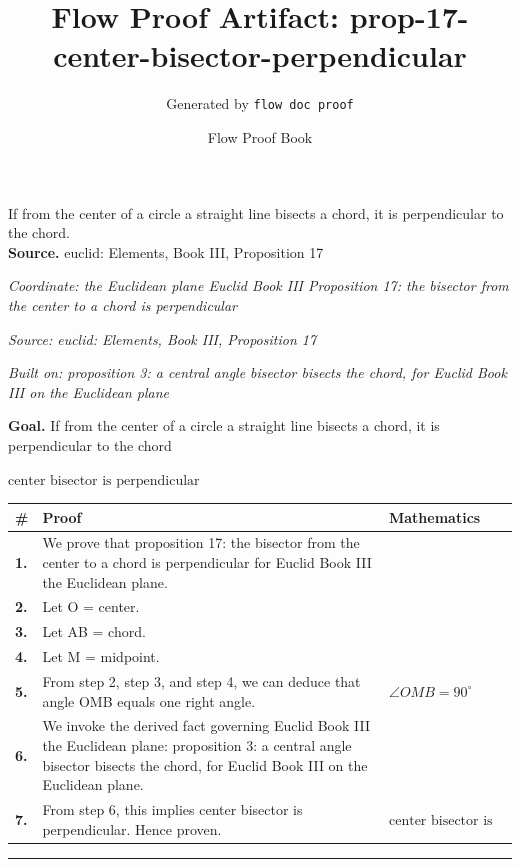 \documentclass[11pt]{article}
\title{Flow Proof Artifact: prop-17-center-bisector-perpendicular}
\author{Generated by \texttt{flow doc proof}}
\date{Flow Proof Book}
\theoremstyle{definition}
\begin{document}
\maketitle
If from the center of a circle a straight line bisects a chord, it is perpendicular to the chord.\\[0.5em]
\textbf{Source.} euclid: Elements, Book III, Proposition 17\\[0.5em]
\bigskip
{}\par
\smallskip\noindent\textit{Coordinate: the Euclidean plane \cdot Euclid Book III \cdot Proposition 17: the bisector from the center to a chord is perpendicular}\par
\smallskip\noindent\textit{Source: euclid: Elements, Book III, Proposition 17}\par
\smallskip\noindent\textit{Built on: proposition 3: a central angle bisector bisects the chord, for Euclid Book III on the Euclidean plane}\par
\medskip
\noindent\textbf{Goal.} If from the center of a circle a straight line bisects a chord, it is perpendicular to the chord\par
\noindent$\displaystyle \text{center bisector is perpendicular}$\par
\medskip
\noindent
\begin{tabular}{@{} >{\raggedright\arraybackslash}p{} >{\raggedright\arraybackslash}p{} >{\raggedleft\arraybackslash}p{} @{}}
\textbf{\#} & \textbf{Proof} & \textbf{Mathematics} \\
\midrule
\textbf{1.} & We prove that proposition 17: the bisector from the center to a chord is perpendicular for Euclid Book III the Euclidean plane. & \\[0.45em]
\textbf{2.} & Let O = center. & \\[0.45em]
\textbf{3.} & Let AB = chord. & \\[0.45em]
\textbf{4.} & Let M = midpoint. & \\[0.45em]
\textbf{5.} & From step 2, step 3, and step 4, we can deduce that angle OMB equals one right angle. & $\displaystyle \angle OMB = 90^\circ$ \\[0.45em]
\textbf{6.} & We invoke the derived fact governing Euclid Book III the Euclidean plane: proposition 3: a central angle bisector bisects the chord, for Euclid Book III on the Euclidean plane. & \\[0.45em]
\textbf{7.} & From step 6, this implies center bisector is perpendicular. Hence proven. & $\displaystyle \text{center bisector is perpendicular}$ \\[0.45em]
\bottomrule
\end{tabular}
\label{thm:Geometry-Euclid Book III-proposition_17_the_bisector_from_the_center_to_a_chord_is_perpendicular}
\par\medskip\hrule
\end{document}

